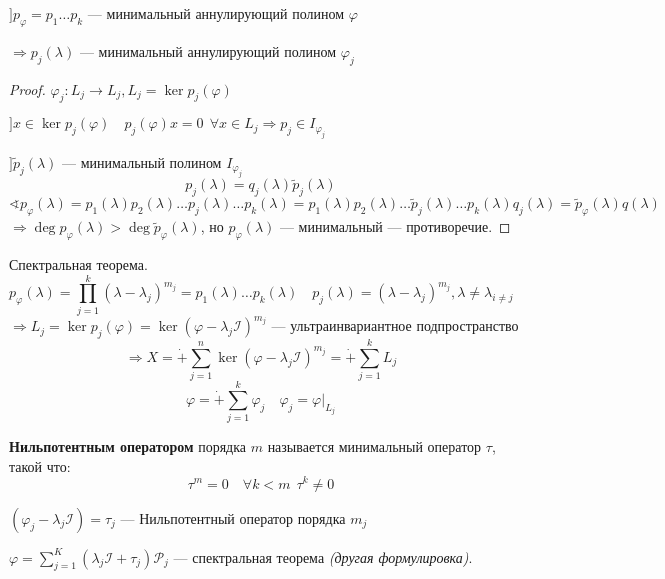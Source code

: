 \begin{lemma}
    $] p_\varphi=p_1\ldots p_k$ --- минимальный аннулирующий полином $\varphi$

    $\Rightarrow p_j(\lambda)$ --- минимальный аннулирующий полином $\varphi_j$
\end{lemma}
\begin{proof}
    $\varphi_j : L_j \rightarrow L_j , L_j=\ker p_j(\varphi)$

    $] x\in\ker p_j(\varphi) \quad p_j(\varphi) x = 0 \ \ \forall x\in L_j \Rightarrow p_j\in I_{\varphi_j}$

    $] \tilde p_j(\lambda)$ --- минимальный полином $I_{\varphi_j}$
    $$p_j(\lambda)=q_j(\lambda)\tilde p_j(\lambda)$$
    $$\sphericalangle p_\varphi(\lambda)=p_1(\lambda)p_2(\lambda)\ldots p_j(\lambda)\ldots p_k(\lambda)=p_1(\lambda)p_2(\lambda)\ldots \tilde p_j(\lambda)\ldots p_k(\lambda)q_j(\lambda)=\tilde p_\varphi(\lambda)q(\lambda)$$
    $\Rightarrow \deg p_\varphi(\lambda) > \deg \tilde p_\varphi(\lambda)$, но $p_\varphi(\lambda)$ --- минимальный --- противоречие.
\end{proof}

\begin{theorem}
    Спектральная теорема.
    $$p_\varphi(\lambda)=\prod_{j=1}^k (\lambda-\lambda_j)^{m_j}=p_1(\lambda)\ldots p_k(\lambda) \quad p_j(\lambda)=(\lambda-\lambda_j)^{m_j}, \lambda\not=\lambda_{i\not=j}$$
    $$\Rightarrow L_j=\ker p_j(\varphi)=\ker(\varphi-\lambda_j\mathcal I)^{m_j} \text{ --- ультраинвариантное подпространство}$$
    $$\Rightarrow X = \dot+ \sum_{j=1}^n \ker (\varphi-\lambda_j\mathcal I)^{m_j}=\dot+\sum_{j=1}^k L_j$$
    $$\varphi = \dot+\sum_{j=1}^k \varphi_j \quad \varphi_j = \varphi|_{L_j}$$
\end{theorem}


\begin{definition}
    \textbf{Нильпотентным оператором} порядка $m$ называется минимальный оператор $\tau$, такой что:
    $$\tau^m=0 \quad \forall k<m \ \ \tau^k\not=0$$
\end{definition}
\begin{remark}
    $(\varphi_j - \lambda_j \mathcal I)=\tau_j$ --- Нильпотентный оператор порядка $m_j$
\end{remark}

$\varphi=\sum\limits_{j=1}^K (\lambda_j \mathcal I + \tau_j)\mathcal P_j$ --- спектральная теорема \textit{(другая формулировка)}.


